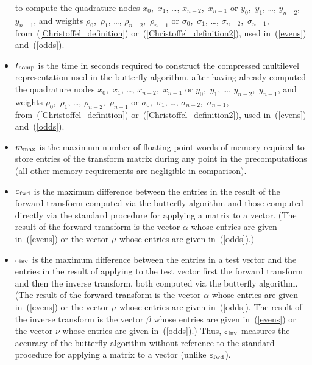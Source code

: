 \documentclass[final,3p,times]{elsarticle}
\def\epsilon{\varepsilon}
\begin{document}
\begin{itemize}
      to compute the quadrature nodes $x_0$,~$x_1$, \dots, $x_{n-2}$,~$x_{n-1}$
      or $y_0$,~$y_1$, \dots, $y_{n-2}$,~$y_{n-1}$,
      and weights $\rho_0$,~$\rho_1$, \dots, $\rho_{n-2}$,~$\rho_{n-1}$
      or $\sigma_0$,~$\sigma_1$, \dots, $\sigma_{n-2}$,~$\sigma_{n-1}$,
      from~(\ref{Christoffel_definition}) or~(\ref{Christoffel_definition2}),
      used in~(\ref{evens}) and~(\ref{odds}).
\item $t_{\rm comp}$ is the time in seconds required to construct
      the compressed multilevel representation used in the butterfly algorithm,
      after having already computed
      the quadrature nodes $x_0$,~$x_1$, \dots, $x_{n-2}$,~$x_{n-1}$
      or $y_0$,~$y_1$, \dots, $y_{n-2}$,~$y_{n-1}$,
      and weights $\rho_0$,~$\rho_1$, \dots, $\rho_{n-2}$,~$\rho_{n-1}$
      or $\sigma_0$,~$\sigma_1$, \dots, $\sigma_{n-2}$,~$\sigma_{n-1}$,
      from~(\ref{Christoffel_definition}) or~(\ref{Christoffel_definition2}),
      used in~(\ref{evens}) and~(\ref{odds}).
\item $m_{\rm max}$ is the maximum number of floating-point words
      of memory required to store entries of the transform matrix
      during any point in the precomputations
      (all other memory requirements are negligible in comparison).
\item $\epsilon_{\rm fwd}$ is the maximum difference between the entries
      in the result of the forward transform computed
      via the butterfly algorithm and those computed directly
      via the standard procedure for applying a matrix to a vector.
      (The result of the forward transform is the vector $\alpha$
      whose entries are given in~(\ref{evens})
      or the vector $\mu$ whose entries are given in~(\ref{odds}).)
\item $\epsilon_{\rm inv}$ is the maximum difference between the entries
      in a test vector and the entries in the result of applying
      to the test vector first the forward transform and
      then the inverse transform, both computed via the butterfly algorithm.
      (The result of the forward transform is the vector $\alpha$
      whose entries are given in~(\ref{evens})
      or the vector $\mu$ whose entries are given in~(\ref{odds}).
      The result of the inverse transform is the vector $\beta$
      whose entries are given in~(\ref{evens})
      or the vector $\nu$ whose entries are given in~(\ref{odds}).)
      Thus, $\epsilon_{\rm inv}$ measures the accuracy
      of the butterfly algorithm without reference to the standard procedure
      for applying a matrix to a vector (unlike $\epsilon_{\rm fwd}$).
\end{itemize}
\end{document}
